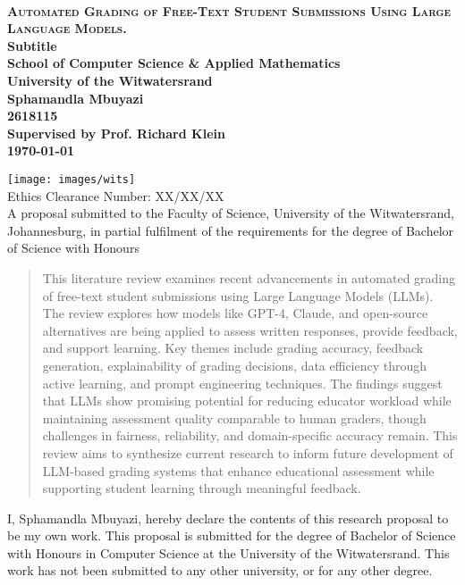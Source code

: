 \setcounter{page}{0}
\ 
\begin{center}
  \vfill
  {
  \huge \bf \textsc{Automated Grading of Free-Text Student Submissions Using Large Language Models.}\\
  \large Subtitle\\[20pt]
  \large School of Computer Science \& Applied Mathematics\\
  \large University of the Witwatersrand\\[20pt]
  \normalsize
  Sphamandla Mbuyazi\\
  2618115\\[20pt]
  Supervised by Prof. Richard Klein\\[10pt]
  \today
  }

  \vfill
  \vfill
  \texttt{[image: images/wits]}
  \vspace{10pt}\\
  \small{Ethics Clearance Number: XX/XX/XX}\\[10pt]
  \small{A proposal submitted to the Faculty of Science, University of the Witwatersrand, Johannesburg,
in partial fulfilment of the requirements for the degree of Bachelor of Science with Honours}\\
\end{center}
\vfill
\newpage

\pagestyle{plain}
\setcounter{page}{1}

\begin{abstract}
This literature review examines recent advancements in automated grading of free-text student submissions using Large Language Models (LLMs). The review explores how models like GPT-4, Claude, and open-source alternatives are being applied to assess written responses, provide feedback, and support learning. Key themes include grading accuracy, feedback generation, explainability of grading decisions, data efficiency through active learning, and prompt engineering techniques. The findings suggest that LLMs show promising potential for reducing educator workload while maintaining assessment quality comparable to human graders, though challenges in fairness, reliability, and domain-specific accuracy remain. This review aims to synthesize current research to inform future development of LLM-based grading systems that enhance educational assessment while supporting student learning through meaningful feedback.
\end{abstract}

\begin{declaration}
I, Sphamandla Mbuyazi, hereby declare the contents of this research proposal to be my own work.
This proposal is submitted for the degree of Bachelor of Science with Honours in Computer Science at the University of the Witwatersrand.
This work has not been submitted to any other university, or for any other degree.
\end{declaration}

